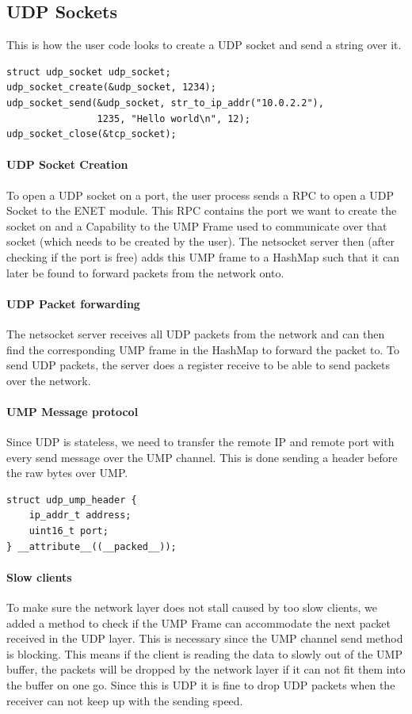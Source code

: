 \subsection{UDP Sockets}

This is how the user code looks to create a UDP socket and send a string over it.
\begin{verbatim}
struct udp_socket udp_socket;
udp_socket_create(&udp_socket, 1234);
udp_socket_send(&udp_socket, str_to_ip_addr("10.0.2.2"), 
                1235, "Hello world\n", 12);
udp_socket_close(&tcp_socket);
\end{verbatim}

\paragraph{UDP Socket Creation}
To open a UDP socket on a port, the user process sends a RPC to open a UDP Socket to the ENET module. This RPC contains the port we want to create the socket on and a Capability to the UMP Frame used to communicate over that socket (which needs to be created by the user). The netsocket server then (after checking if the port is free) adds this UMP frame to a HashMap such that it can later be found to forward packets from the network onto.

\paragraph{UDP Packet forwarding}
The netsocket server receives all UDP packets from the network and can then find the corresponding UMP frame in the HashMap to forward the packet to. To send UDP packets, the server does a register receive to be able to send packets over the network.

\paragraph{UMP Message protocol}

Since UDP is stateless, we need to transfer the remote IP and remote port with every send message over the UMP channel. This is done sending a header before the raw bytes over UMP.

\begin{verbatim}
struct udp_ump_header {
    ip_addr_t address;
    uint16_t port;
} __attribute__((__packed__));
\end{verbatim}

\paragraph{Slow clients}
To make sure the network layer does not stall caused by too slow clients, we added a method to check if the UMP Frame can accommodate the next packet received in the UDP layer. This is necessary since the UMP channel send method is blocking. This means if the client is reading the data to slowly out of the UMP buffer, the packets will be dropped by the network layer if it can not fit them into the buffer on one go. Since this is UDP it is fine to drop UDP packets when the receiver can not keep up with the sending speed.

